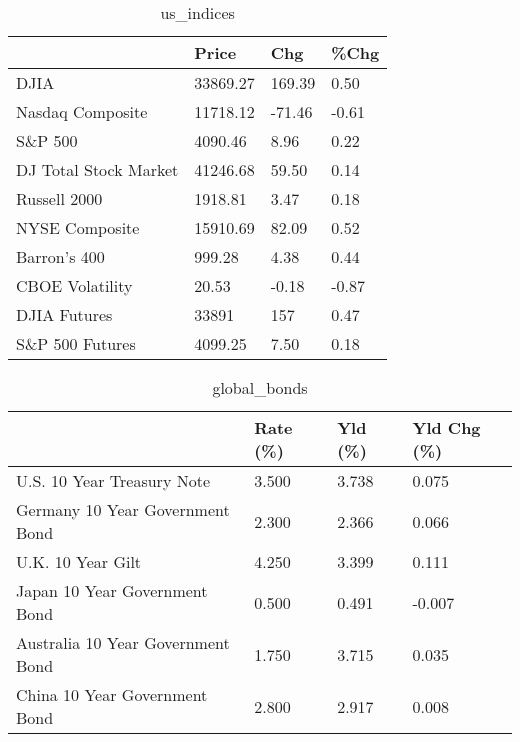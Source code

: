 \documentclass{article}%
\begin{document}
%


\begin{table}[htbp]%
\caption{us\_indices}%
\centering%
\begin{adjustbox}{width=1\textwidth}%
\begin{tabular}{llll}
\toprule
                      &    Price &    Chg &  \%Chg \\
\midrule
                 DJIA & 33869.27 & 169.39 &  0.50 \\
     Nasdaq Composite & 11718.12 & -71.46 & -0.61 \\
              S\&P 500 &  4090.46 &   8.96 &  0.22 \\
DJ Total Stock Market & 41246.68 &  59.50 &  0.14 \\
         Russell 2000 &  1918.81 &   3.47 &  0.18 \\
       NYSE Composite & 15910.69 &  82.09 &  0.52 \\
         Barron's 400 &   999.28 &   4.38 &  0.44 \\
      CBOE Volatility &    20.53 &  -0.18 & -0.87 \\
         DJIA Futures &    33891 &    157 &  0.47 \\
      S\&P 500 Futures &  4099.25 &   7.50 &  0.18 \\
\bottomrule
\end{tabular}
%
\end{adjustbox}%
\end{table}

%


\begin{table}[htbp]%
\caption{global\_bonds}%
\centering%
\begin{adjustbox}{width=1\textwidth}%
\begin{tabular}{llll}
\toprule
                                  & Rate (\%) & Yld (\%) & Yld Chg (\%) \\
\midrule
       U.S. 10 Year Treasury Note &    3.500 &   3.738 &       0.075 \\
  Germany 10 Year Government Bond &    2.300 &   2.366 &       0.066 \\
                U.K. 10 Year Gilt &    4.250 &   3.399 &       0.111 \\
    Japan 10 Year Government Bond &    0.500 &   0.491 &      -0.007 \\
Australia 10 Year Government Bond &    1.750 &   3.715 &       0.035 \\
    China 10 Year Government Bond &    2.800 &   2.917 &       0.008 \\
\bottomrule
\end{tabular}
%
\end{adjustbox}%
\end{table}
\end{document}
